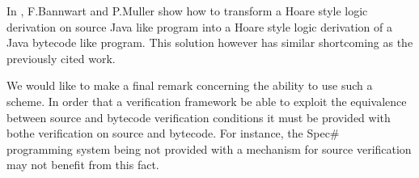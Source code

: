 

 In \cite{FB04LBT}, F.Bannwart and P.Muller show how to transform a Hoare style logic derivation on source Java like
 program into a Hoare style logic derivation of a Java bytecode like program. This solution however has similar  shortcoming
as the previously cited work.

We would like to make a final remark concerning the ability to use such a scheme.
In order that a verification framework be able to exploit the equivalence between source
 and bytecode verification conditions it must be provided with bothe verification on source and bytecode. 
For instance, the Spec\#~\cite{BLS04sp} programming system being not provided with a mechanism for source verification may not benefit from this fact.
  


